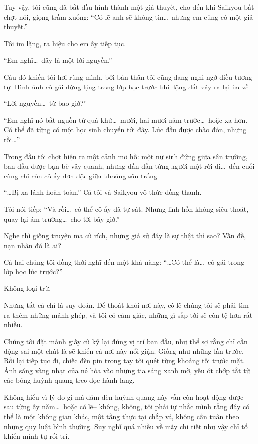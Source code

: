 \documentclass[../main.tex]{subfiles}
\begin{document}
Tuy vậy, tôi cũng đã bắt đầu hình thành một giả thuyết, cho đến khi Saikyou bất chợt nói, giọng trầm xuống: ``Có lẽ anh sẽ không tin\dots\ nhưng em cũng có một giả thuyết.''

Tôi im lặng, ra hiệu cho em ấy tiếp tục.

``Em nghĩ\dots\ đây là một lời nguyền.''

Câu đó khiến tôi hơi rùng mình, bởi bản thân tôi cũng đang nghi ngờ điều tương tự. Hình ảnh cô gái đứng lặng trong lớp học trước khi động đất xảy ra lại ùa về.

``Lời nguyền\dots\ từ bao giờ?''

``Em nghĩ nó bắt nguồn từ quá khứ\dots\ mười, hai mươi năm trước\dots\ hoặc xa hơn. Có thể đã từng có một học sinh chuyển tới đây. Lúc đầu được chào đón, nhưng rồi\dots''

Trong đầu tôi chợt hiện ra một cảnh mơ hồ: một nữ sinh đứng giữa sân trường, ban đầu được bạn bè vây quanh, nhưng dần dần từng người một rời đi\dots\ đến cuối cùng chỉ còn cô ấy đơn độc giữa khoảng sân trống.

``\dots Bị xa lánh hoàn toàn.'' Cả tôi và Saikyou vô thức đồng thanh.

Tôi nói tiếp: ``Và rồi\dots\ có thể cô ấy đã tự sát. Nhưng linh hồn không siêu thoát, quay lại ám trường\dots\ cho tới bây giờ.''

Nghe thì giống truyện ma cũ rích, nhưng giả sử đây là sự thật thì sao? Vấn đề, nạn nhân đó là ai?

Cả hai chúng tôi đồng thời nghĩ đến một khả năng: ``\dots Có thể là\dots\ cô gái trong lớp học lúc trước?''

Không loại trừ.

Nhưng tất cả chỉ là suy đoán. Để thoát khỏi nơi này, có lẽ chúng tôi sẽ phải tìm ra thêm những mảnh ghép, và tôi có cảm giác, những gì sắp tới sẽ còn tệ hơn rất nhiều.

Chúng tôi đặt mảnh giấy cũ kỹ lại đúng vị trí ban đầu, như thể sợ rằng chỉ cần động sai một chút là sẽ khiến cả nơi này nổi giận. Giống như những lần trước. Rồi lại tiếp tục đi, chiếc đèn pin trong tay tôi quét từng khoảng tối trước mặt. Ánh sáng vàng nhạt của nó hòa vào những tia sáng xanh mờ, yếu ớt chớp tắt từ các bóng huỳnh quang treo dọc hành lang.

Không hiểu vì lý do gì mà đám đèn huỳnh quang này vẫn còn hoạt động được sau từng ấy năm\dots\ hoặc có lẽ-- không, không, tôi phải tự nhắc mình rằng đây có thể là một không gian khác, một tầng thực tại chắp vá, không cần tuân theo những quy luật bình thường. Suy nghĩ quá nhiều về mấy chi tiết như vậy chỉ tổ khiến mình tự rối trí.
\end{document}
